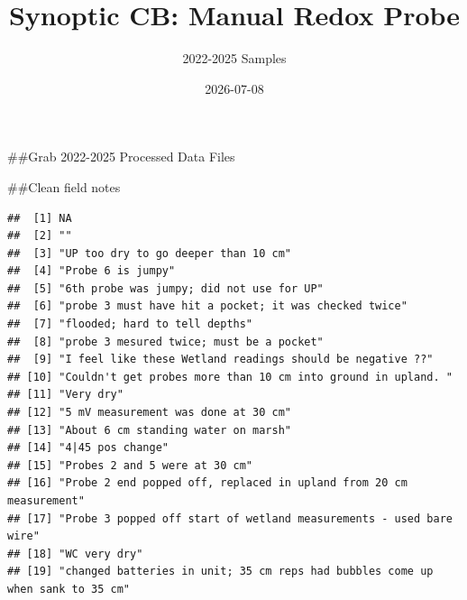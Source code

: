 \documentclass[
]{article}
\title{Synoptic CB: Manual Redox Probe}
\author{2022-2025 Samples}
\date{2026-07-08}
\newenvironment{Shaded}{\begin{snugshade}}{\end{snugshade}}
\newcommand{\FunctionTok}[1]{\textcolor[rgb]{0.13,0.29,0.53}{\textbf{#1}}}
\newcommand{\NormalTok}[1]{#1}
\newcommand{\SpecialCharTok}[1]{\textcolor[rgb]{0.81,0.36,0.00}{\textbf{#1}}}
\begin{document}
\maketitle

{
\setcounter{tocdepth}{2}
\tableofcontents
}
\#\#Grab 2022-2025 Processed Data Files

\#\#Clean field notes

\begin{Shaded}
\end{Shaded}

\begin{verbatim}
##  [1] NA                                                                            
##  [2] ""                                                                            
##  [3] "UP too dry to go deeper than 10 cm"                                          
##  [4] "Probe 6 is jumpy"                                                            
##  [5] "6th probe was jumpy; did not use for UP"                                     
##  [6] "probe 3 must have hit a pocket; it was checked twice"                        
##  [7] "flooded; hard to tell depths"                                                
##  [8] "probe 3 mesured twice; must be a pocket"                                     
##  [9] "I feel like these Wetland readings should be negative ??"                    
## [10] "Couldn't get probes more than 10 cm into ground in upland. "                 
## [11] "Very dry"                                                                    
## [12] "5 mV measurement was done at 30 cm"                                          
## [13] "About 6 cm standing water on marsh"                                          
## [14] "4|45 pos change"                                                             
## [15] "Probes 2 and 5 were at 30 cm"                                                
## [16] "Probe 2 end popped off, replaced in upland from 20 cm measurement"           
## [17] "Probe 3 popped off start of wetland measurements - used bare wire"           
## [18] "WC very dry"                                                                 
## [19] "changed batteries in unit; 35 cm reps had bubbles come up when sank to 35 cm"
\end{verbatim}
\end{document}
